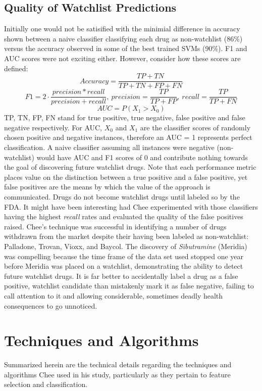 \documentclass[twoside,11pt]{article}
\begin{document}
\subsection{Quality of Watchlist Predictions}
Initially one would not be satisified with the minimial difference in accuracy shown between a naive classifier classifying each drug as non-watchlist (86\%) versus the accuracy observed in some of the best trained SVMs (90\%). F1 and AUC scores were not exciting either. However, consider how these scores are defined:
\[
  Accuracy = \frac{TP + TN}{TP + TN + FP + FN}
\]
\[
  F1 = 2 \cdot \frac{precision * recall}{precision + recall}, \ precision = \frac{TP}{TP+FP},\ recall = \frac{TP}{TP+FN}
\]
\[
  AUC = P(X_{1} > X_{0})
\]
TP, TN, FP, FN stand for true positive, true negative, false positive and false negative respectively. For AUC, $X_{0}$ and $X_{1}$ are the classifier scores of randomly chosen positive and negative instances, therefore an AUC = 1 represents perfect classification. A naive classifier assuming all instances were negative (non-watchlist) would have AUC and F1 scores of 0 and contribute nothing towards the goal of discovering future watchlist drugs. Note that each performance metric places value on the distinction between a true positive and a false positive, yet false positives are the means by which the value of the approach is communicated. Drugs do not become watchlist drugs until labeled so by the FDA. It might have been interesting had Chee experimented with those classifiers having the highest \textit{recall} rates and evaluated the quality of the false positives raised.
Chee's technique was successful in identifying a number of drugs withdrawn from the market despite their having been labeled as non-watchlist:  Palladone,  Trovan, Vioxx, and Baycol. The discovery of \textit{Sibutramine} (Meridia) was compelling because the time frame of the data set used stopped one year before Meridia was placed on a watchlist, demonstrating the ability to detect future watchlist drugs. It is far better to accidentally label a drug as a false positive, watchlist candidate than mistakenly mark it as false negative, failing to call attention to it and allowing considerable, sometimes deadly health consequences to go unnoticed.

\section{Techniques and Algorithms}
Summarized herein are the technical details regarding the techniques and algorithms Chee used in his study, particularly as they pertain to feature selection and classification.
\end{document}

